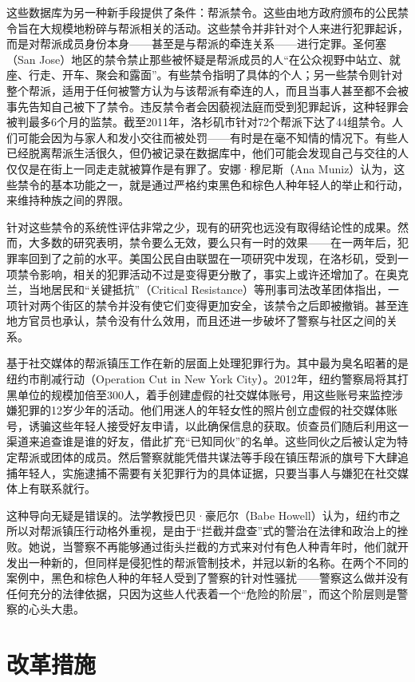 \documentclass[fontset=fandol, a4paper, 12pt, openright]{ctexbook}
\begin{document}
这些数据库为另一种新手段提供了条件：帮派禁令。这些由地方政府颁布的公民禁令旨在大规模地粉碎与帮派相关的活动。这些禁令并非针对个人来进行犯罪起诉，而是对帮派成员身份本身——甚至是与帮派的牵连关系——进行定罪。圣何塞（San Jose）地区的禁令禁止那些被怀疑是帮派成员的人“在公众视野中站立、就座、行走、开车、聚会和露面”。有些禁令指明了具体的个人；另一些禁令则针对整个帮派，适用于任何被警方认为与该帮派有牵连的人，而且当事人甚至都不会被事先告知自己被下了禁令。违反禁令者会因藐视法庭而受到犯罪起诉，这种轻罪会被判最多6个月的监禁。截至2011年，洛杉矶市针对72个帮派下达了44组禁令。人们可能会因为与家人和发小交往而被处罚——有时是在毫不知情的情况下。有些人已经脱离帮派生活很久，但仍被记录在数据库中，他们可能会发现自己与交往的人仅仅是在街上一同走走就被算作是有罪了。安娜·穆尼斯（Ana Muniz）认为，这些禁令的基本功能之一，就是通过严格约束黑色和棕色人种年轻人的举止和行动，来维持种族之间的界限。

针对这些禁令的系统性评估非常之少，现有的研究也远没有取得结论性的成果。然而，大多数的研究表明，禁令要么无效，要么只有一时的效果——在一两年后，犯罪率回到了之前的水平。美国公民自由联盟在一项研究中发现，在洛杉矶，受到一项禁令影响，相关的犯罪活动不过是变得更分散了，事实上或许还增加了。在奥克兰，当地居民和“关键抵抗”（Critical Resistance）等刑事司法改革团体指出，一项针对两个街区的禁令并没有使它们变得更加安全，该禁令之后即被撤销。甚至连地方官员也承认，禁令没有什么效用，而且还进一步破坏了警察与社区之间的关系。

基于社交媒体的帮派镇压工作在新的层面上处理犯罪行为。其中最为臭名昭著的是纽约市削减行动（Operation Cut in New York City）。2012年，纽约警察局将其打黑单位的规模加倍至300人，着手创建虚假的社交媒体账号，用这些账号来监控涉嫌犯罪的12岁少年的活动。他们用迷人的年轻女性的照片创立虚假的社交媒体账号，诱骗这些年轻人接受好友申请，以此确保信息的获取。侦查员们随后利用这一渠道来追查谁是谁的好友，借此扩充“已知同伙”的名单。这些同伙之后被认定为特定帮派或团体的成员。然后警察就能凭借共谋法等手段在镇压帮派的旗号下大肆追捕年轻人，实施逮捕不需要有关犯罪行为的具体证据，只要当事人与嫌犯在社交媒体上有联系就行。

这种导向无疑是错误的。法学教授巴贝·豪厄尔（Babe Howell）认为，纽约市之所以对帮派镇压行动格外重视，是由于“拦截并盘查”式的警治在法律和政治上的挫败。她说，当警察不再能够通过街头拦截的方式来对付有色人种青年时，他们就开发出一种新的，但同样是侵犯性的帮派管制技术，并冠以新的名称。在两个不同的案例中，黑色和棕色人种的年轻人受到了警察的针对性骚扰——警察这么做并没有任何充分的法律依据，只因为这些人代表着一个“危险的阶层”，而这个阶层则是警察的心头大患。

\section{改革措施}
\end{document}
